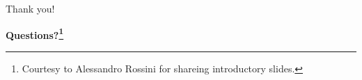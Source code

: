 \documentclass[dvips,slidetop,mathserif,brown]{beamer}
\begin{document}

\begin{frame}{Thank you!}
  \vspace{5em}
  \begin{center}
    \begin{Huge}
      \textbf{Questions?\footnote{Courtesy to Alessandro Rossini for shareing introductory slides.}}
    \end{Huge}
  \end{center}
  \vspace{5em}
\end{frame}
\end{document}
